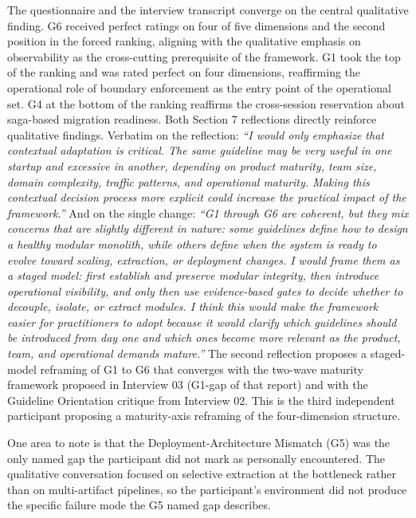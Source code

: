 The questionnaire and the interview transcript converge on the central qualitative finding. G6 received perfect ratings on four of five dimensions and the second position in the forced ranking, aligning with the qualitative emphasis on observability as the cross-cutting prerequisite of the framework. G1 took the top of the ranking and was rated perfect on four dimensions, reaffirming the operational role of boundary enforcement as the entry point of the operational set. G4 at the bottom of the ranking reaffirms the cross-session reservation about saga-based migration readiness. Both Section 7 reflections directly reinforce qualitative findings. Verbatim on the reflection: \emph{``I would only emphasize that contextual adaptation is critical. The same guideline may be very useful in one startup and excessive in another, depending on product maturity, team size, domain complexity, traffic patterns, and operational maturity. Making this contextual decision process more explicit could increase the practical impact of the framework.''} And on the single change: \emph{``G1 through G6 are coherent, but they mix concerns that are slightly different in nature: some guidelines define how to design a healthy modular monolith, while others define when the system is ready to evolve toward scaling, extraction, or deployment changes. I would frame them as a staged model: first establish and preserve modular integrity, then introduce operational visibility, and only then use evidence-based gates to decide whether to decouple, isolate, or extract modules. I think this would make the framework easier for practitioners to adopt because it would clarify which guidelines should be introduced from day one and which ones become more relevant as the product, team, and operational demands mature.''} The second reflection proposes a staged-model reframing of G1 to G6 that converges with the two-wave maturity framework proposed in Interview 03 (G1-gap of that report) and with the Guideline Orientation critique from Interview 02. This is the third independent participant proposing a maturity-axis reframing of the four-dimension structure.

One area to note is that the Deployment-Architecture Mismatch (G5) was the only named gap the participant did not mark as personally encountered. The qualitative conversation focused on selective extraction at the bottleneck rather than on multi-artifact pipelines, so the participant's environment did not produce the specific failure mode the G5 named gap describes.

